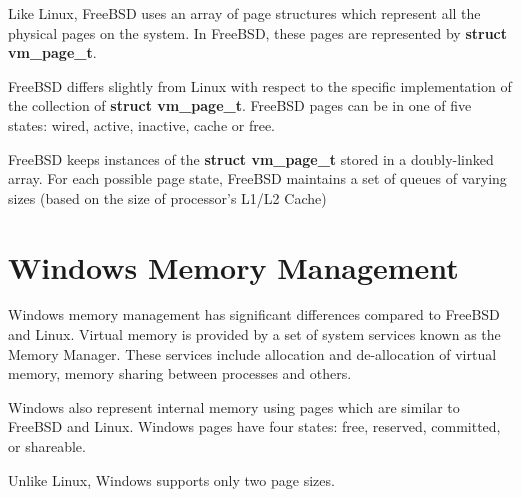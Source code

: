 \documentclass[onecolumn,10pt]{IEEETran}
\begin{document}
Like Linux, FreeBSD uses an array of page structures which represent all the physical pages on the system.  In FreeBSD, these pages are represented by \textbf{struct vm\_page\_t}.  

FreeBSD differs slightly from Linux with respect to the specific implementation of the collection of \textbf{struct vm\_page\_t}.  FreeBSD pages can be in one of five states: wired, active, inactive, cache or free.

FreeBSD keeps instances of the \textbf{struct vm\_page\_t} stored in a doubly-linked array.  For each possible page state, FreeBSD maintains a set of queues of varying sizes (based on the size of processor's L1/L2 Cache)

\section{Windows Memory Management}

Windows memory management has significant differences compared to FreeBSD and Linux.  Virtual memory is provided by a set of system services known as the Memory Manager.  These services include allocation and de-allocation of virtual memory, memory sharing between processes and others.

Windows also represent internal memory using pages which are similar to FreeBSD and Linux.  Windows pages have four states: free, reserved, committed, or shareable.

Unlike Linux, Windows supports only two page sizes.
\end{document}
